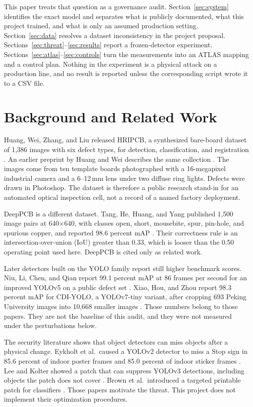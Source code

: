 \documentclass[conference]{IEEEtran}
\begin{document}
This paper treats that question as a governance audit. Section~\ref{sec:system} identifies the exact model and separates what is publicly documented, what this project trained, and what is only an assumed production setting. Section~\ref{sec:data} resolves a dataset inconsistency in the project proposal. Sections~\ref{sec:threat}--\ref{sec:results} report a frozen-detector experiment. Sections~\ref{sec:atlas}--\ref{sec:controls} turn the measurements into an ATLAS mapping and a control plan. Nothing in the experiment is a physical attack on a production line, and no result is reported unless the corresponding script wrote it to a CSV file.

\section{Background and Related Work}
Huang, Wei, Zhang, and Liu released HRIPCB, a synthesized bare-board dataset of 1{,}386 images with six defect types, for detection, classification, and registration \cite{huang2020hripcb}. An earlier preprint by Huang and Wei describes the same collection \cite{huang2019arxiv}. The images come from ten template boards photographed with a 16-megapixel industrial camera and a 6--12\,mm lens under two diffuse ring lights. Defects were drawn in Photoshop. The dataset is therefore a public research stand-in for an automated optical inspection cell, not a record of a named factory deployment.

DeepPCB is a different dataset. Tang, He, Huang, and Yang published 1{,}500 image pairs at 640$\times$640, with classes open, short, mousebite, spur, pin-hole, and spurious copper, and reported 98.6 percent mAP \cite{tang2019deeppcb}. Their correctness rule is an intersection-over-union (IoU) greater than 0.33, which is looser than the 0.50 operating point used here. DeepPCB is cited only as related work.

Later detectors built on the YOLO family report still higher benchmark scores. Niu, Li, Chen, and Qian report 99.1 percent mAP at 86 frames per second for an improved YOLOv5 on a public defect set \cite{niu2023yolov5}. Xiao, Hou, and Zhou report 98.3 percent mAP for CDI-YOLO, a YOLOv7-tiny variant, after cropping 693 Peking University images into 10{,}668 smaller images \cite{xiao2024cdiyolo}. Those numbers belong to those papers. They are not the baseline of this audit, and they were not measured under the perturbations below.

The security literature shows that object detectors can miss objects after a physical change. Eykholt et al.\ caused a YOLOv2 detector to miss a Stop sign in 85.6 percent of indoor poster frames and 85.0 percent of indoor sticker frames \cite{eykholt2018physical}. Lee and Kolter showed a patch that can suppress YOLOv3 detections, including objects the patch does not cover \cite{lee2019patch}. Brown et al.\ introduced a targeted printable patch for classifiers \cite{brown2017patch}. Those papers motivate the threat. This project does not implement their optimization procedures.
\end{document}
